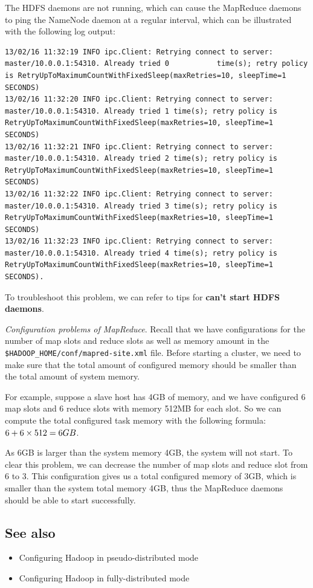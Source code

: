 The HDFS daemons are not running, which can cause the MapReduce daemons to ping the NameNode daemon at a regular interval, which can be illustrated with the following log output:
\begin{verbatim}
13/02/16 11:32:19 INFO ipc.Client: Retrying connect to server: master/10.0.0.1:54310. Already tried 0           time(s); retry policy is RetryUpToMaximumCountWithFixedSleep(maxRetries=10, sleepTime=1 SECONDS)
13/02/16 11:32:20 INFO ipc.Client: Retrying connect to server: master/10.0.0.1:54310. Already tried 1 time(s); retry policy is RetryUpToMaximumCountWithFixedSleep(maxRetries=10, sleepTime=1 SECONDS)
13/02/16 11:32:21 INFO ipc.Client: Retrying connect to server: master/10.0.0.1:54310. Already tried 2 time(s); retry policy is RetryUpToMaximumCountWithFixedSleep(maxRetries=10, sleepTime=1 SECONDS)
13/02/16 11:32:22 INFO ipc.Client: Retrying connect to server: master/10.0.0.1:54310. Already tried 3 time(s); retry policy is RetryUpToMaximumCountWithFixedSleep(maxRetries=10, sleepTime=1 SECONDS)
13/02/16 11:32:23 INFO ipc.Client: Retrying connect to server: master/10.0.0.1:54310. Already tried 4 time(s); retry policy is RetryUpToMaximumCountWithFixedSleep(maxRetries=10, sleepTime=1 SECONDS).
\end{verbatim}

To troubleshoot this problem, we can refer to tips for \textbf{can't start HDFS daemons}.

\emph{Configuration problems of MapReduce}. Recall that we have configurations for the number of map slots and reduce slots as well as memory amount in the \verb|$HADOOP_HOME/conf/mapred-site.xml| file. Before starting a cluster, we need to make sure that the total amount of configured memory should be smaller than the total amount of system memory.

For example, suppose a slave host has 4GB of memory, and we have configured 6 map slots and 6 reduce slots with memory 512MB for each slot. So we can compute the total configured task memory with the following formula:  $6 \time 512 + 6 \times 512 = 6GB$.

As 6GB is larger than the system memory 4GB, the system will not start. To clear this problem, we can decrease the number of map slots and reduce slot from 6 to 3. This configuration gives us a total configured memory of 3GB, which is smaller than the system total memory 4GB, thus the MapReduce daemons should be able to start successfully.

\subsection*{See also}
\begin{itemize}
\item Configuring Hadoop in pseudo-distributed mode
\item Configuring Hadoop in fully-distributed mode
\end{itemize}

